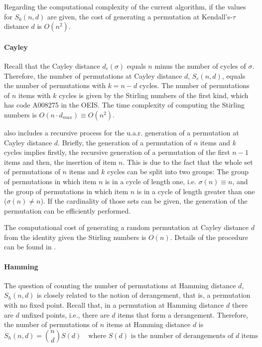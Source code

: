 \documentclass[article,nojss]{jss}
\begin{document}
Regarding the computational complexity of the current algorithm, if the values for $S_k(n,d)$ are given, the cost of generating a permutation at Kendall's-$\tau$ distance $d$ is $O(n^2)$.

\paragraph{Cayley}
Recall that the Cayley distance $d_c(\sigma)$ equals $n$ minus the number of cycles of $\sigma$. Therefore, the number of permutations at Cayley distance $d$, $S_c(n,d)$,  equals the number of permutations with $k=n-d$ cycles. The number of permutations of $n$ items with $k$ cycles is given by the Stirling numbers of the first kind, which has code A008275 in the OEIS. The time complexity of computing the Stirling numbers is $O(n \cdot d_{max}) \equiv O(n^2)$. 

 also includes a recursive process for the u.a.r. generation of a permutation at Cayley distance $d$. Briefly, the generation of a permutation of $n$ items and $k$ cycles implies firstly, the recursive generation of a permutation of the first $n-1$ items and then, the insertion of item $n$. This is due to the fact that the whole set of permutations of $n$ items and $k$ cycles can be split into two groups: The group of permutations in which item $n$ is in a cycle of length one, i.e. $\sigma(n)\equiv n$, and the group of permutations in which item $n$ is in a cycle of length greater than one ($\sigma(n) \neq n$). If the cardinality of those sets can be given, the generation of the permutation can be efficiently performed. 

The computational cost of generating a random permutation at Cayley distance $d$ from the identity given the Stirling numbers is $O(n)$. Details of the procedure can be found in \cite{Irurozki2014b}. 

\paragraph{Hamming}
The question of counting the number of permutations at Hamming distance $d$, $S_h(n,d)$ is closely related to the notion of derangement, that is, a permutation with no fixed point. Recall that, in a permutation at Hamming distance $d$ there are $d$ unfixed points, i.e., there are $d$ items that form a derangement. Therefore, the number of permutations of $n$ items at Hamming distance $d$ is
\[	S_h(n,d) = \binom{n}{d}S(d) \quad \text{where $S(d)$ is the number of derangements of $d$ items}	\]
\end{document}
